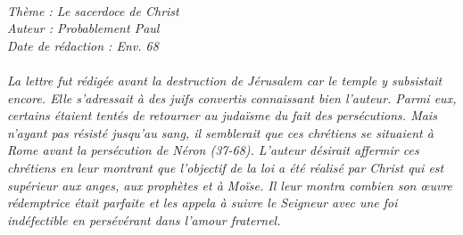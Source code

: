 \BFont
\noindent\hrulefill
{\footnotesize
\textit{
\bigskip
{\centering{}
\\Thème : Le sacerdoce de Christ
\\Auteur : Probablement Paul
\\Date de rédaction : Env. 68\\}
}
\textit{
\\La lettre fut rédigée avant la destruction de Jérusalem car le temple y subsistait encore. Elle s’adressait à des juifs convertis connaissant bien l’auteur. Parmi eux, certains étaient tentés de retourner au judaïsme du fait des persécutions. Mais n’ayant pas résisté jusqu’au sang, il semblerait que ces chrétiens se situaient à Rome avant la persécution de Néron (37-68). L’auteur désirait affermir ces chrétiens en leur montrant que l’objectif de la loi a été réalisé par Christ qui est supérieur aux anges, aux prophètes et à Moïse. Il leur montra combien son œuvre rédemptrice était parfaite et les appela à suivre le Seigneur avec une foi indéfectible en persévérant dans l’amour fraternel.\bigskip
}
}
\par\nobreak\noindent\hrulefill
